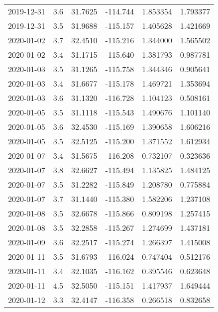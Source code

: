 \begin{tabular}{lrrrrr}
2019-12-31 &       3.6 &  31.7625 &  -114.744 &         1.853354 &         1.793377 \\
2019-12-31 &       3.5 &  31.9688 &  -115.157 &         1.405628 &         1.421669 \\
2020-01-02 &       3.7 &  32.4510 &  -115.216 &         1.344000 &         1.565502 \\
2020-01-02 &       3.4 &  31.1715 &  -115.640 &         1.381793 &         0.987781 \\
2020-01-03 &       3.5 &  31.1265 &  -115.758 &         1.344346 &         0.905641 \\
2020-01-03 &       3.4 &  31.6677 &  -115.178 &         1.469721 &         1.353694 \\
2020-01-03 &       3.6 &  31.1320 &  -116.728 &         1.104123 &         0.508161 \\
2020-01-05 &       3.5 &  31.1118 &  -115.543 &         1.490676 &         1.101140 \\
2020-01-05 &       3.6 &  32.4530 &  -115.169 &         1.390658 &         1.606216 \\
2020-01-05 &       3.5 &  32.5125 &  -115.200 &         1.371552 &         1.612934 \\
2020-01-07 &       3.4 &  31.5675 &  -116.208 &         0.732107 &         0.323636 \\
2020-01-07 &       3.8 &  32.6627 &  -115.494 &         1.135825 &         1.484125 \\
2020-01-07 &       3.5 &  31.2282 &  -115.849 &         1.208780 &         0.775884 \\
2020-01-07 &       3.7 &  31.1440 &  -115.380 &         1.582206 &         1.237108 \\
2020-01-08 &       3.5 &  32.6678 &  -115.866 &         0.809198 &         1.257415 \\
2020-01-08 &       3.5 &  32.2858 &  -115.267 &         1.274699 &         1.437181 \\
2020-01-09 &       3.6 &  32.2517 &  -115.274 &         1.266397 &         1.415008 \\
2020-01-11 &       3.5 &  31.6793 &  -116.024 &         0.747404 &         0.512176 \\
2020-01-11 &       3.4 &  32.1035 &  -116.162 &         0.395546 &         0.623648 \\
2020-01-11 &       4.5 &  32.5050 &  -115.151 &         1.417937 &         1.649444 \\
2020-01-12 &       3.3 &  32.4147 &  -116.358 &         0.266518 &         0.832658 \\

\end{tabular}
